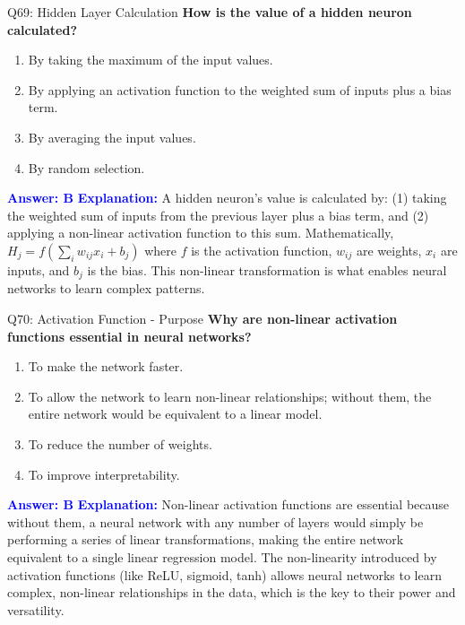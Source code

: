\documentclass[8pt]{beamer}
\begin{document}
	\begin{frame}{Q69: Hidden Layer Calculation}
		\fontsize{6.5}{7.5}\selectfont
		\textbf{How is the value of a hidden neuron calculated?}
		\begin{enumerate}
			\item By taking the maximum of the input values.
			\item By applying an activation function to the weighted sum of inputs plus a bias term.
			\item By averaging the input values.
			\item By random selection.
		\end{enumerate}
		\vspace{0.1cm}
		\textcolor{blue}{\textbf{Answer: B}}
		\vspace{0.1cm}
		\textcolor{blue}{\textbf{Explanation:}} A hidden neuron's value is calculated by: (1) taking the weighted sum of inputs from the previous layer plus a bias term, and (2) applying a non-linear activation function to this sum. Mathematically, $H_j = f(\sum_{i} w_{ij} x_i + b_j)$ where $f$ is the activation function, $w_{ij}$ are weights, $x_i$ are inputs, and $b_j$ is the bias. This non-linear transformation is what enables neural networks to learn complex patterns.
	\end{frame}
	
	\begin{frame}{Q70: Activation Function - Purpose}
		\fontsize{6.5}{7.5}\selectfont
		\textbf{Why are non-linear activation functions essential in neural networks?}
		\begin{enumerate}
			\item To make the network faster.
			\item To allow the network to learn non-linear relationships; without them, the entire network would be equivalent to a linear model.
			\item To reduce the number of weights.
			\item To improve interpretability.
		\end{enumerate}
		\vspace{0.1cm}
		\textcolor{blue}{\textbf{Answer: B}}
		\vspace{0.1cm}
		\textcolor{blue}{\textbf{Explanation:}} Non-linear activation functions are essential because without them, a neural network with any number of layers would simply be performing a series of linear transformations, making the entire network equivalent to a single linear regression model. The non-linearity introduced by activation functions (like ReLU, sigmoid, tanh) allows neural networks to learn complex, non-linear relationships in the data, which is the key to their power and versatility.
	\end{frame}
	
\end{document}
